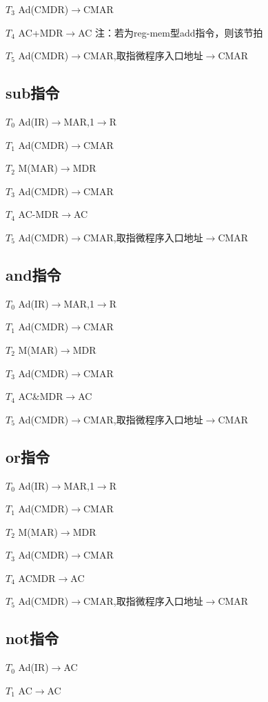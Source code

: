 \documentclass[UTF8]{ctexrep}
\begin{document}
\(T_{3}\) Ad(CMDR)$\to$CMAR

\(T_{4}\) AC+MDR$\to$AC 注：若为reg-mem型add指令，则该节拍

\(T_{5}\) Ad(CMDR)$\to$CMAR,取指微程序入口地址$\to$CMAR


\subsection{sub指令}

\(T_{0}\) Ad(IR)$\to$MAR,1$\to$R

\(T_{1}\) Ad(CMDR)$\to$CMAR

\(T_{2}\) M(MAR)$\to$MDR

\(T_{3}\) Ad(CMDR)$\to$CMAR

\(T_{4}\) AC-MDR$\to$AC

\(T_{5}\) Ad(CMDR)$\to$CMAR,取指微程序入口地址$\to$CMAR


\subsection{and指令}

\(T_{0}\) Ad(IR)$\to$MAR,1$\to$R

\(T_{1}\) Ad(CMDR)$\to$CMAR

\(T_{2}\) M(MAR)$\to$MDR

\(T_{3}\) Ad(CMDR)$\to$CMAR

\(T_{4}\) AC\&MDR$\to$AC

\(T_{5}\) Ad(CMDR)$\to$CMAR,取指微程序入口地址$\to$CMAR


\subsection{or指令}

\(T_{0}\) Ad(IR)$\to$MAR,1$\to$R

\(T_{1}\) Ad(CMDR)$\to$CMAR

\(T_{2}\) M(MAR)$\to$MDR

\(T_{3}\) Ad(CMDR)$\to$CMAR

\(T_{4}\) ACMDR$\to$AC

\(T_{5}\) Ad(CMDR)$\to$CMAR,取指微程序入口地址$\to$CMAR

\subsection{not指令}

\(T_{0}\) Ad(IR)$\to$AC

\(T_{1}\) AC$\to$AC
\end{document}
